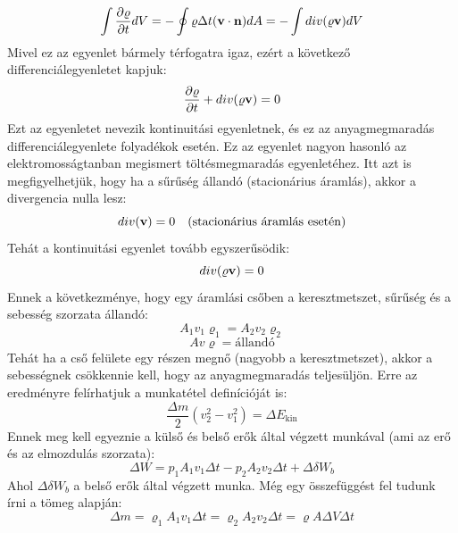 \documentclass[../main.tex]{subfiles}
\begin{document}
\begin{equation}
    \int \frac{\partial \varrho}{\partial t} dV = - \oint \varrho \Delta t (\bold{v} \cdot \bold{n}) dA = - \int div(\varrho \bold{v}) dV
\end{equation}
Mivel ez az egyenlet bármely térfogatra igaz, ezért a következő differenciálegyenletet kapjuk:
\begin{equation}
    \frac{\partial \varrho}{\partial t} + div(\varrho \bold{v}) = 0
\end{equation}
Ezt az egyenletet nevezik kontinuitási egyenletnek, és ez az anyagmegmaradás differenciálegyenlete folyadékok esetén. Ez az egyenlet nagyon hasonló 
az elektromosságtanban megismert töltésmegmaradás egyenletéhez. Itt azt is megfigyelhetjük, hogy ha a sűrűség állandó (stacionárius áramlás), akkor a divergencia
nulla lesz:
\begin{equation}
    div(\bold{v}) = 0 \quad \text{(stacionárius áramlás esetén)}
\end{equation}
Tehát a kontinuitási egyenlet tovább egyszerűsödik:
\begin{equation}
    div(\varrho \bold{v}) = 0
\end{equation}
Ennek a következménye, hogy egy áramlási csőben a keresztmetszet, sűrűség és a sebesség szorzata állandó:
\begin{equation}
    A_1 v_1 \varrho_1 = A_2 v_2 \varrho_2
\end{equation}
\begin{equation}
    A v \varrho = \text{állandó}
\end{equation}
Tehát ha a cső felülete egy részen megnő (nagyobb a keresztmetszet), akkor a sebességnek csökkennie kell, hogy az anyagmegmaradás teljesüljön.
Erre az eredményre felírhatjuk a munkatétel definícióját is:
\begin{equation}
  \frac{\Delta m}{2} (v_2^2 - v_1^2) = \Delta E_{\text{kin}}
\end{equation}
Ennek meg kell egyeznie a külső és belső erők által végzett munkával (ami az erő és az elmozdulás szorzata):
\begin{equation}
   \Delta W = p_1 A_1 v_1 \Delta t - p_2 A_2 v_2 \Delta t + \Delta \delta W_b
\end{equation}
Ahol $\Delta \delta W_b$ a belső erők által végzett munka. Még egy összefüggést fel tudunk írni a tömeg alapján:
\begin{equation}
    \Delta m = \varrho_1 A_1 v_1 \Delta t = \varrho_2 A_2 v_2 \Delta t = \varrho A \Delta V \Delta t
\end{equation}
\end{document}

